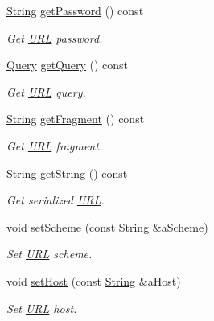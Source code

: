 \begin{DoxyCompactItemize}
\hyperlink{namespacelibrary_1_1io_a7469b45835a4421045db344d6a5a1f85}{String} \hyperlink{classlibrary_1_1io_1_1_u_r_l_a5d8c1d85b26f35d95153a2ed1f45e578}{get\+Password} () const
\begin{DoxyCompactList}\small\item\em Get \hyperlink{classlibrary_1_1io_1_1_u_r_l}{U\+RL} password. \end{DoxyCompactList}\item 
\hyperlink{namespacelibrary_1_1io_a39ebaf2265de78ba79eb5347f2af61b3}{Query} \hyperlink{classlibrary_1_1io_1_1_u_r_l_a9e2dfc922d148118443d8247679a28c1}{get\+Query} () const
\begin{DoxyCompactList}\small\item\em Get \hyperlink{classlibrary_1_1io_1_1_u_r_l}{U\+RL} query. \end{DoxyCompactList}\item 
\hyperlink{namespacelibrary_1_1io_a7469b45835a4421045db344d6a5a1f85}{String} \hyperlink{classlibrary_1_1io_1_1_u_r_l_acf491cea3422f7dc8576fff7431c3a0b}{get\+Fragment} () const
\begin{DoxyCompactList}\small\item\em Get \hyperlink{classlibrary_1_1io_1_1_u_r_l}{U\+RL} fragment. \end{DoxyCompactList}\item 
\hyperlink{namespacelibrary_1_1io_a7469b45835a4421045db344d6a5a1f85}{String} \hyperlink{classlibrary_1_1io_1_1_u_r_l_ae79c849e58c983a0991c7c75bb565596}{get\+String} () const
\begin{DoxyCompactList}\small\item\em Get serialized \hyperlink{classlibrary_1_1io_1_1_u_r_l}{U\+RL}. \end{DoxyCompactList}\item 
void \hyperlink{classlibrary_1_1io_1_1_u_r_l_a8905d2ff07fe8aeebaaee71621a0f6f2}{set\+Scheme} (const \hyperlink{namespacelibrary_1_1io_a7469b45835a4421045db344d6a5a1f85}{String} \&a\+Scheme)
\begin{DoxyCompactList}\small\item\em Set \hyperlink{classlibrary_1_1io_1_1_u_r_l}{U\+RL} scheme. \end{DoxyCompactList}\item 
void \hyperlink{classlibrary_1_1io_1_1_u_r_l_ab11ded07b47b35dbc0bb6907c0cfd5c5}{set\+Host} (const \hyperlink{namespacelibrary_1_1io_a7469b45835a4421045db344d6a5a1f85}{String} \&a\+Host)
\begin{DoxyCompactList}\small\item\em Set \hyperlink{classlibrary_1_1io_1_1_u_r_l}{U\+RL} host. \end{DoxyCompactList}\item 

\end{DoxyCompactItemize}
